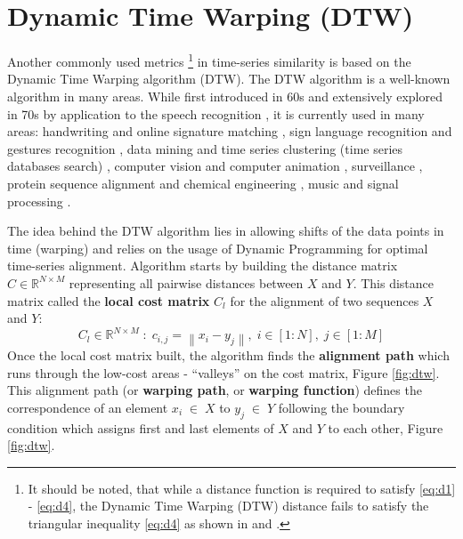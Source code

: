 \section{Dynamic Time Warping (DTW)}
Another commonly used metrics 
\footnote{It should be noted, that while a distance function is required to satisfy \ref{eq:d1} - \ref{eq:d4}, the Dynamic Time Warping (DTW) distance fails to satisfy the triangular inequality \ref{eq:d4} as shown in \cite{citeulike:4343286} and \cite{citeulike:4343933}.}
in time-series similarity is based on the Dynamic Time Warping algorithm (DTW). The DTW algorithm is a well-known algorithm in many areas. While first introduced in 60s \cite{citeulike:3733907} and extensively explored in 70s by application to the speech recognition \cite{citeulike:603020}, \cite{citeulike:3496861} it is currently used in many areas: handwriting and online signature matching \cite{citeulike:2838910} \cite{citeulike:2584345}, sign language recognition \cite{citeulike:3789957} and gestures recognition \cite{citeulike:3789964} \cite{citeulike:3789957}, data mining and time series clustering (time series databases search) \cite{citeulike:3815076} \cite{citeulike:3733893} \cite{citeulike:3788783} \cite{citeulike:3731715} \cite{citeulike:3731713} \cite{citeulike:3789897}, computer vision and computer animation \cite{citeulike:3728229}, surveillance \cite{citeulike:964832}, protein sequence alignment and chemical engineering \cite{citeulike:3733894}, music and signal processing \cite{citeulike:3736775} \cite{citeulike:3728229} \cite{citeulike:3728228}.

The idea behind the DTW algorithm lies in allowing shifts of the data points in time (warping) and relies on the usage of Dynamic Programming \cite{citeulike:3733907} for optimal time-series alignment. Algorithm starts by building the distance matrix $C \in \mathbb{R}^{N \times M}$ representing all pairwise distances between $X$ and $Y$. This distance matrix called the \textbf{local cost matrix} $C_{l}$ for the alignment of two sequences $X$ and $Y$:
\begin{equation}
\label{eq:localcost}
C_{l} \in \mathbb{R}^{N \times M} \; : \; c_{i,j} = \left\| x_{i} - y_{j} \right\|, \; i \in [1:N], \; j \in [1:M]
\end{equation}
Once the local cost matrix built, the algorithm finds the \textbf{alignment path} which runs through the low-cost areas - ``valleys'' on the cost matrix, Figure \ref{fig:dtw}. This alignment path (or \textbf{warping path}, or \textbf{warping function}) defines the correspondence of an element $x_{i} \; \in \; X$ to $y_{j} \; \in \; Y$ following the boundary condition which assigns first and last elements of $X$ and $Y$ to each other, Figure \ref{fig:dtw}.

